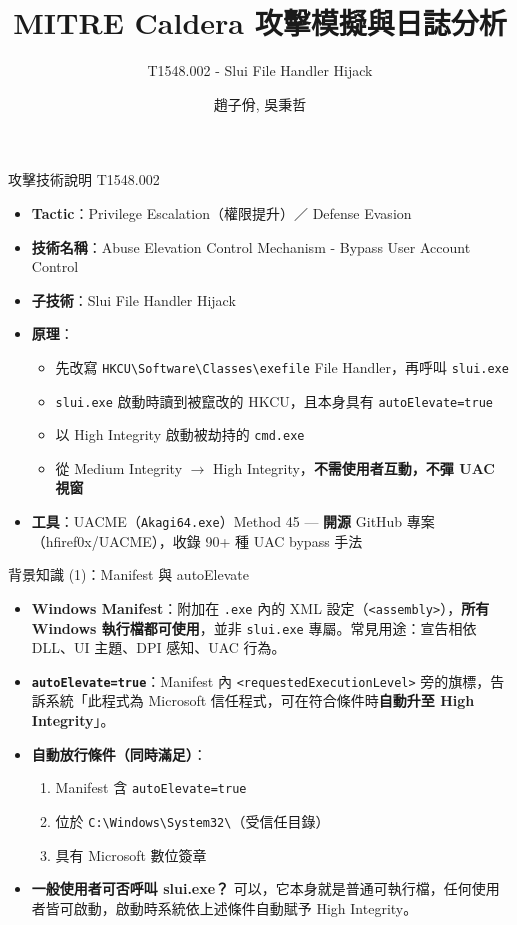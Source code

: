 \documentclass[12pt,aspectratio=169]{beamer}
\title{MITRE Caldera 攻擊模擬與日誌分析}
\subtitle{T1548.002 - Slui File Handler Hijack}
\author{趙子佾, 吳秉哲}
\begin{document}
\maketitle
\begin{frame}{攻擊技術說明 T1548.002}
\begin{itemize}
  \item \textbf{Tactic}：Privilege Escalation（權限提升）／ Defense Evasion
  \item \textbf{技術名稱}：Abuse Elevation Control Mechanism - Bypass User Account Control
  \item \textbf{子技術}：Slui File Handler Hijack
  \item \textbf{原理}：
  \begin{itemize}
    \item 先改寫 \texttt{HKCU\textbackslash Software\textbackslash Classes\textbackslash exefile} File Handler，再呼叫 \texttt{slui.exe}
    \item \texttt{slui.exe} 啟動時讀到被竄改的 HKCU，且本身具有 \texttt{autoElevate=true}
    \item 以 High Integrity 啟動被劫持的 \texttt{cmd.exe}
    \item 從 Medium Integrity $\rightarrow$ High Integrity，\textbf{不需使用者互動，不彈 UAC 視窗}
  \end{itemize}
  \item \textbf{工具}：UACME（\texttt{Akagi64.exe}）Method 45 — \textbf{開源} GitHub 專案（hfiref0x/UACME），收錄 90+ 種 UAC bypass 手法
\end{itemize}
\end{frame}

\begin{frame}{背景知識 (1)：Manifest 與 autoElevate}
\begin{itemize}
  \item \textbf{Windows Manifest}：附加在 \texttt{.exe} 內的 XML 設定（\texttt{<assembly>}），\textbf{所有 Windows 執行檔都可使用}，並非 \texttt{slui.exe} 專屬。常見用途：宣告相依 DLL、UI 主題、DPI 感知、UAC 行為。
  \item \textbf{\texttt{autoElevate=true}}：Manifest 內 \texttt{<requestedExecutionLevel>} 旁的旗標，告訴系統「此程式為 Microsoft 信任程式，可在符合條件時\textbf{自動升至 High Integrity}」。
  \item \textbf{自動放行條件（同時滿足）}：
  \begin{enumerate}
    \item Manifest 含 \texttt{autoElevate=true}
    \item 位於 \texttt{C:\textbackslash Windows\textbackslash System32\textbackslash}（受信任目錄）
    \item 具有 Microsoft 數位簽章
  \end{enumerate}
  \item \textbf{一般使用者可否呼叫 slui.exe？} 可以，它本身就是普通可執行檔，任何使用者皆可啟動，啟動時系統依上述條件自動賦予 High Integrity。
\end{itemize}
\end{frame}
\end{document}
